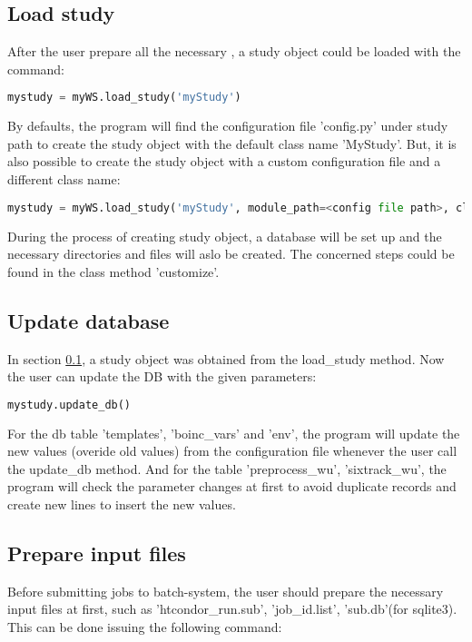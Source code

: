 \subsection{Load study}\label{loadstudy}
After the user prepare all the necessary , a study object could be loaded with the command:

\begin{lstlisting}[language=Python]
mystudy = myWS.load_study('myStudy')
\end{lstlisting}
By defaults, the program will find the configuration file 'config.py' under study path to create the study object with the default class name 'MyStudy'. But, it is also possible to create the study object with a custom configuration file and a different class name:

\begin{lstlisting}[language=Python]
mystudy = myWS.load_study('myStudy', module_path=<config file path>, class_name=custom_name)
\end{lstlisting}

During the process of creating study object, a database will be set up and the necessary directories and files will aslo be created. The concerned steps could be found in the class method 'customize'.

\subsection{Update database}
In section \ref{loadstudy}, a study object was obtained from the load\_study method. Now the user can update the DB with the given parameters:

\begin{lstlisting}[language=Python]
mystudy.update_db()
\end{lstlisting}

For the db table 'templates', 'boinc\_vars' and 'env', the program will update  the new values (overide old values) from the configuration file whenever the user call the update\_db method. And for the table 'preprocess\_wu', 'sixtrack\_wu', the program will check the parameter changes at first to avoid duplicate records and create new lines to insert the new values. 

\subsection{Prepare input files}
Before submitting jobs to batch-system, the user should prepare the necessary input files at first, such as 'htcondor\_run.sub', 'job\_id.list', 'sub.db'(for sqlite3). This can be done issuing the following command: 

